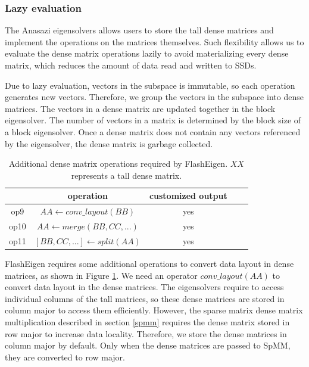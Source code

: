 
\subsubsection{Lazy evaluation} \label{sec:lazy_eval}
The Anasazi eigensolvers allows users to store the tall dense matrices and
implement the operations on the matrices themselves. Such flexibility allows
us to evaluate the dense matrix operations lazily \cite{Ching12} to avoid
materializing
every dense matrix, which reduces the amount of data read and written to SSDs.

Due to lazy evaluation, vectors in the subspace is immutable, so each operation
generates new vectors. Therefore, we group the vectors in the subspace into
dense matrices. The vectors in a dense matrix are updated together in the block
eigensolver. The number of vectors in a matrix is determined by the block
size of a block eigensolver. Once a dense matrix does not contain any vectors
referenced by the eigensolver, the dense matrix is garbage collected.

\begin{table}
	\begin{center}
		\small
		\begin{tabular}{|c|c|c|c|c|}
			\hline
			& operation & customized output \\
			\hline
			op9 & $AA \leftarrow conv\_layout(BB)$ & yes \\
			\hline
			op10 & $AA \leftarrow merge(BB, CC, ...)$ & yes \\
			\hline
			op11 & $[BB, CC, ...] \leftarrow split(AA)$ & yes \\
			\hline
		\end{tabular}
		\normalsize
	\end{center}
	\caption{Additional dense matrix operations required by FlashEigen.
		$XX$ represents a tall dense matrix.}
	\label{add_ops}
\end{table}

FlashEigen requires some additional operations to convert data layout
in dense matrices, as shown in Figure \ref{add_ops}.
We need an operator $conv\_layout(AA)$ to convert data layout
in the dense matrices. The eigensolvers require to access individual columns
of the tall matrices, so these dense matrices are stored in column major
to access them efficiently. However,
the sparse matrix dense matrix multiplication described in section \ref{spmm}
requires the dense matrix stored in row major to increase data locality.
Therefore, we store the dense matrices in column major by default. Only
when the dense matrices are passed to SpMM, they are converted to row major.

